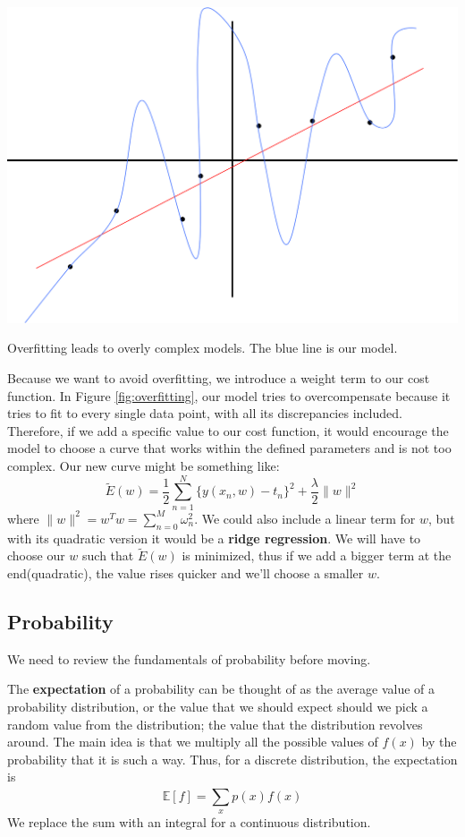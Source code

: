 \documentclass{tufte-handout}
\begin{document}
		\begin{marginfigure}
			\includegraphics[width=\linewidth]{overfitting}	
			\caption{Overfitting leads to overly complex models. The blue line
				is our model.}
			\label{fig:overfitting}
		\end{marginfigure}
	Because we want to avoid overfitting, we introduce a weight term to our cost 
	function. In Figure \ref{fig:overfitting}, our model tries to overcompensate 
	because it tries to fit to every single data point, with all its discrepancies included. 
	Therefore, if we add a specific value to our cost function, it would encourage the model
	to choose a curve that works within the defined parameters and is not too complex. Our 
	new curve might be something like:
	\[ \tilde{E}(w)= \frac{1}{2} \sum_{n=1}^{N}\{y(x_{n},w)-t_{n}\}^{2}+\frac{\lambda}{2}\|w\|^{2}\]
	where $\|w\|^{2}=w^{T}w = \sum_{n=0}^{M}\omega_{n}^{2}$. We could also include a linear term
	for $w$, but with its quadratic version it would be a \textbf{ridge regression}. We will have 
	to choose our $w$ such that $\tilde{E}(w)$ is minimized, thus if we add a bigger term at the 
	end(quadratic), the value rises quicker and we'll choose a smaller $w$.

	\subsection{Probability}
		We need to review the fundamentals of probability before moving. 


		The \textbf{expectation} of a probability can be thought of as the average value of a 
		probability distribution, or the value that we should expect should we pick a random 
		value from the distribution; the value that the distribution revolves around. The main 
		idea is that we multiply all the possible values of $f(x)$ by the probability that 
		it is such a way. Thus, for a discrete distribution, the expectation is 
		\[ \mathbb{E}[f]= \sum_{x}^{}p(x)f(x)\]We replace the sum with an integral 
		for a continuous distribution.	
\end{document}
